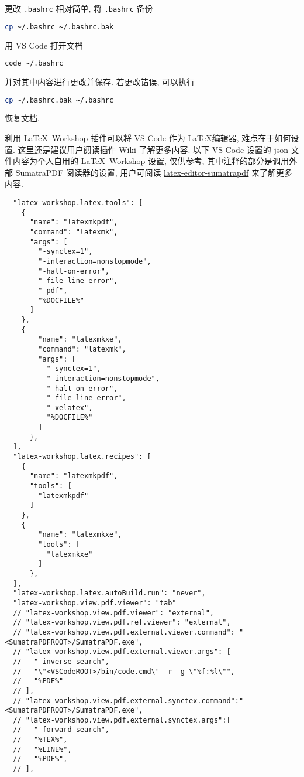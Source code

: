 更改 \texttt{.bashrc} 相对简单,
将 \texttt{.bashrc} 备份
\begin{lstlisting}[language=bash]
  cp ~/.bashrc ~/.bashrc.bak
\end{lstlisting}
用 VS Code 打开文档
\begin{lstlisting}[language=bash]
  code ~/.bashrc
\end{lstlisting}
并对其中内容进行更改并保存.
若更改错误,
可以执行
\begin{lstlisting}[language=bash]
  cp ~/.bashrc.bak ~/.bashrc
\end{lstlisting}
恢复文档.

利用
\href{https://marketplace.visualstudio.com/items?itemName=James-Yu.latex-workshop}{\LaTeX\ Workshop}
插件可以将 VS Code 作为 \LaTeX 编辑器,
难点在于如何设置.
这里还是建议用户阅读插件
\href{https://github.com/James-Yu/LaTeX-Workshop/wiki}{Wiki}
了解更多内容.
以下 VS Code 设置的 json 文件内容为个人自用的 \LaTeX\ Workshop 设置,
仅供参考,
其中注释的部分是调用外部 SumatraPDF 阅读器的设置,
用户可阅读
\href{https://github.com/OsbertWang/latex-editor-sumatrapdf}{latex-editor-sumatrapdf}
来了解更多内容.
\begin{lstlisting}
  "latex-workshop.latex.tools": [
    {
      "name": "latexmkpdf",
      "command": "latexmk",
      "args": [
        "-synctex=1",
        "-interaction=nonstopmode",
        "-halt-on-error",
        "-file-line-error",
        "-pdf",
        "%DOCFILE%"
      ]
    },
    {
        "name": "latexmkxe",
        "command": "latexmk",
        "args": [
          "-synctex=1",
          "-interaction=nonstopmode",
          "-halt-on-error",
          "-file-line-error",
          "-xelatex",
          "%DOCFILE%"
        ]
      },
  ],
  "latex-workshop.latex.recipes": [
    {
      "name": "latexmkpdf",
      "tools": [
        "latexmkpdf"
      ]
    },
    {
        "name": "latexmkxe",
        "tools": [
          "latexmkxe"
        ]
      },
  ],
  "latex-workshop.latex.autoBuild.run": "never",
  "latex-workshop.view.pdf.viewer": "tab"
  // "latex-workshop.view.pdf.viewer": "external",
  // "latex-workshop.view.pdf.ref.viewer": "external",
  // "latex-workshop.view.pdf.external.viewer.command": "<SumatraPDFROOT>/SumatraPDF.exe",
  // "latex-workshop.view.pdf.external.viewer.args": [
  //   "-inverse-search",
  //   "\"<VSCodeROOT>/bin/code.cmd\" -r -g \"%f:%l\"",
  //   "%PDF%"
  // ],
  // "latex-workshop.view.pdf.external.synctex.command":"<SumatraPDFROOT>/SumatraPDF.exe",
  // "latex-workshop.view.pdf.external.synctex.args":[
  //   "-forward-search",
  //   "%TEX%",
  //   "%LINE%",
  //   "%PDF%",
  // ],
\end{lstlisting}

